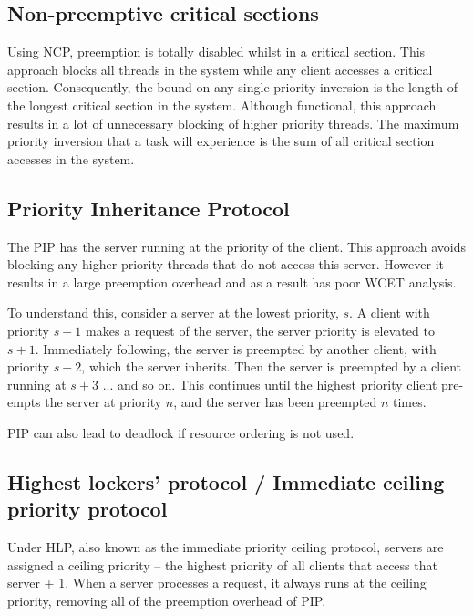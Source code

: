 \subsection{Non-preemptive critical sections}

Using \gls{NCP}, preemption is totally disabled whilst in a critical section.
This approach blocks all threads in the system while any client accesses a critical section.
Consequently, the bound on any single priority inversion is the length of the longest critical section in the system.
Although functional, this approach results in a lot of unnecessary blocking of higher priority threads.
The maximum priority inversion that a task will experience is the sum of all critical section accesses in the system.

\subsection{Priority Inheritance Protocol}
\label{sec:pip}

The \gls{PIP} has the server running at the priority of the client.
This approach avoids blocking any higher priority threads that do not access this server.
However it results in a large preemption overhead and as a result has poor WCET analysis.

To understand this, consider a  server at the lowest priority, $s$.
A client with priority $s + 1$ makes a request of the server, the server priority is elevated to $s + 1$.
Immediately following, the server is preempted by another client, with priority $s + 2$, which the server inherits.
Then the server is preempted by a client running at $s + 3$ ... and so on.
This continues until the highest priority client pre-empts the server at priority $n$, and the server has been preempted $n$ times.

\gls{PIP} can also lead to deadlock if resource ordering is not used.

\subsection{Highest lockers' protocol / Immediate ceiling priority protocol}
\label{sec:hlp}

Under \gls{HLP}, also known as the immediate priority ceiling protocol, servers are assigned a ceiling priority -- the highest priority of all clients that access that server + 1.
When a server processes a request, it always runs at the ceiling priority, removing all of the preemption overhead of \gls{PIP}.

